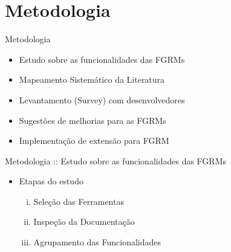 \documentclass[t,14pt,mathserif]{beamer}
\begin{document}
\section{Metodologia}

\begin{frame}{Metodologia}

    \begin{itemize}
        \item Estudo sobre as funcionalidades das FGRMs
        \item Mapeamento Sistemático da Literatura~\cite{Petersen2008}
        \item Levantamento (Survey) com
              desenvolvedores~\cite{wohlin2012experimentation}
        \item Sugestões de melhorias para as FGRMs
        \item Implementação de extensão para FGRM
    \end{itemize}
\end{frame}




\begin{frame}{Metodologia :: Estudo sobre as funcionalidades das FGRMs}
    \begin{itemize}
        \item Etapas do estudo
            \begin{enumerate}[(i)]
                \item Seleção das Ferramentas
                \item Inspeção da Documentação
                \item Agrupamento das Funcionalidades
            \end{enumerate}
    \end{itemize}
\end{frame}
\end{document}
